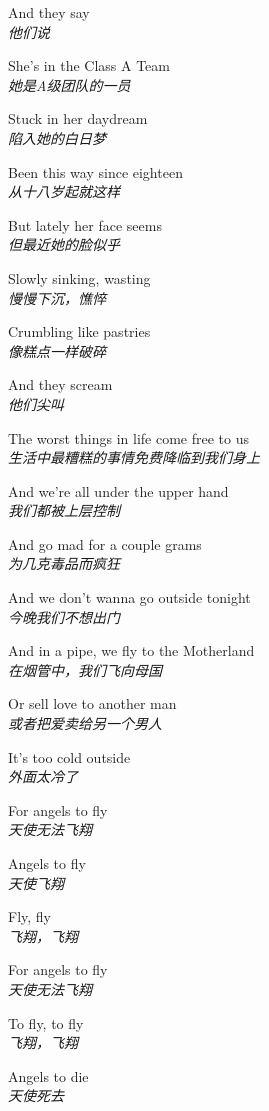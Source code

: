 \begin{spacing}{1.5}
\begin{flushleft}
And they say\\
\textit{他们说}\lyricspace

She's in the Class A Team\\
\textit{她是A级团队的一员}\lyricspace

Stuck in her daydream\\
\textit{陷入她的白日梦}\lyricspace

Been this way since eighteen\\
\textit{从十八岁起就这样}\lyricspace

But lately her face seems\\
\textit{但最近她的脸似乎}\lyricspace

Slowly sinking, wasting\\
\textit{慢慢下沉，憔悴}\lyricspace

Crumbling like pastries\\
\textit{像糕点一样破碎}\lyricspace

And they scream\\
\textit{他们尖叫}\lyricspace

The worst things in life come free to us\\
\textit{生活中最糟糕的事情免费降临到我们身上}\lyricspace

And we're all under the upper hand\\
\textit{我们都被上层控制}\lyricspace

And go mad for a couple grams\\
\textit{为几克毒品而疯狂}\lyricspace

And we don't wanna go outside tonight\\
\textit{今晚我们不想出门}\lyricspace

And in a pipe, we fly to the Motherland\\
\textit{在烟管中，我们飞向母国}\lyricspace

Or sell love to another man\\
\textit{或者把爱卖给另一个男人}\lyricspace

It's too cold outside\\
\textit{外面太冷了}\lyricspace

For angels to fly\\
\textit{天使无法飞翔}\lyricspace

Angels to fly\\
\textit{天使飞翔}\lyricspace

Fly, fly\\
\textit{飞翔，飞翔}\lyricspace

For angels to fly\\
\textit{天使无法飞翔}\lyricspace

To fly, to fly\\
\textit{飞翔，飞翔}\lyricspace

Angels to die\\
\textit{天使死去}\lyricspace
\end{flushleft}
\end{spacing} 
